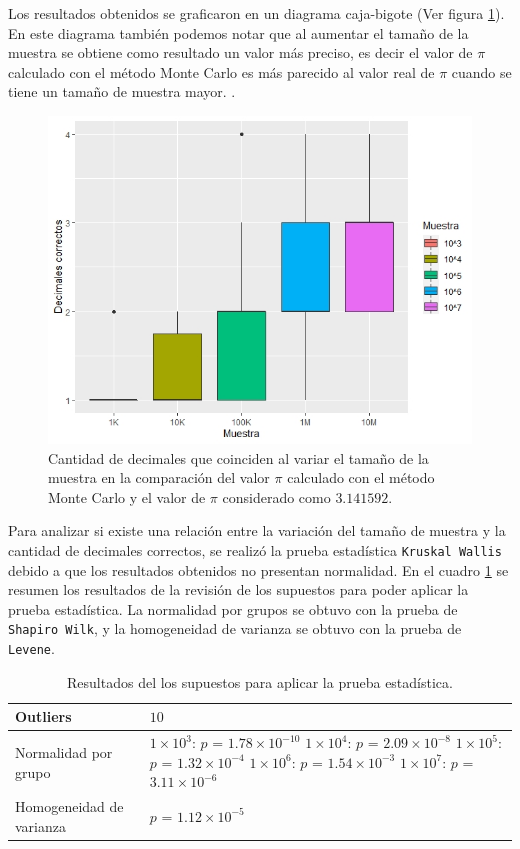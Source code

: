 \documentclass{article}
\begin{document}
Los resultados obtenidos se graficaron en un diagrama caja-bigote (Ver figura \ref{Figura2}). En este diagrama también podemos notar que al aumentar el tamaño de la muestra se obtiene como resultado un valor más preciso, es decir el valor de $\pi$ calculado con el método Monte Carlo es más parecido al valor real de $\pi$ cuando se tiene un tamaño de muestra mayor. 
\newpage
.
\bigskip
\begin{figure} [h!]%
    \centering
    \includegraphics[width=150mm]{Figura2.jpeg} %
    \caption{Cantidad de decimales que coinciden al variar el tamaño de la muestra en la comparación del valor $\pi$ calculado con el método Monte Carlo y el valor de $\pi$ considerado como $3.141592$.}
    \label{Figura2}
\end{figure}

Para analizar si existe una relación entre la variación del tamaño de muestra y la cantidad de decimales correctos, se realizó la prueba estadística \texttt{Kruskal Wallis} debido a que los resultados obtenidos no presentan normalidad. En el cuadro \ref{Cuadro4} se  resumen los resultados de la revisión de los supuestos para poder aplicar la prueba estadística. La normalidad por grupos se obtuvo con la prueba de \texttt{Shapiro Wilk}, y la homogeneidad de varianza se obtuvo con la prueba de \texttt{Levene}.

\begin{table}[ht]
\centering
\caption{Resultados del los supuestos para aplicar la prueba estadística.}
\smallskip

\begin{tabular}{ |p{5cm}|p{3.6cm}|}
 \hline
 Outliers & $10$ \\
 \hline
 Normalidad por grupo & $1\times 10^{3}$: $p$ = $1.78\times 10^{-10}$ $1\times 10^{4}$: $p$ = $2.09\times 10^{-8}$ $1\times 10^{5}$: $p$ = $1.32\times 10^{-4}$ $1\times 10^{6}$: $p$ = $1.54\times 10^{-3}$ $1\times 10^{7}$: $p$ = $3.11\times 10^{-6}$\\
 \hline
 Homogeneidad de varianza & $p$ = $1.12\times 10^{-5}$ \\
 \hline
\end{tabular}
\label{Cuadro4}
\end{table}
\end{document}
